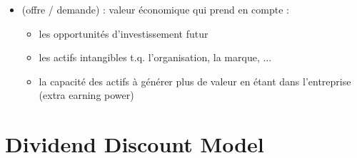 \begin{itemize}
    \item {} (offre / demande) : valeur économique qui prend en compte :
    \begin{itemize}
        \item les opportunités d'investissement futur
        \item les actifs intangibles t.q. l’organisation, la marque, ...
        \item la capacité des actifs à générer plus de valeur en étant dans l'entreprise (extra earning power)
    \end{itemize}
\end{itemize}

\section{Dividend Discount Model}

